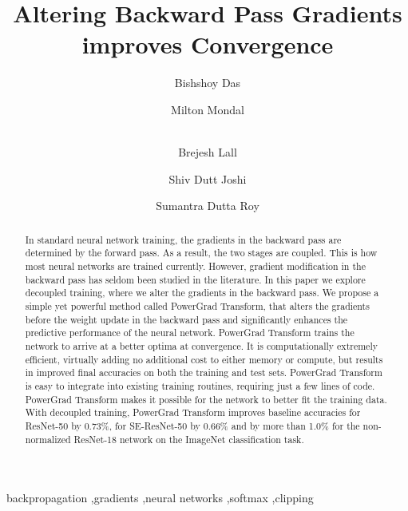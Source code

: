 \documentclass[times,sort&compress]{elsarticle}
\begin{document}
\clearpage


\ifpreprint
  \setcounter{page}{1}
\else
  \setcounter{page}{1}
\fi

\begin{frontmatter}

\title{Altering Backward Pass Gradients improves Convergence}

\author[1]{Bishshoy Das}

\author[1]{Milton Mondal}

\author[1]{\\ Brejesh Lall}

\author[1]{Shiv Dutt Joshi}

\author[1]{Sumantra Dutta Roy}


\address[1]{Electrical Engineering Department, Indian Institute of Technology Delhi, Hauz Khas, New Delhi - 110016, India}



\begin{abstract}
In standard neural network training, the gradients in the backward pass are determined
by the forward pass. As a result, the two stages are coupled. This is how most neural
networks are trained currently. However, gradient modification in the backward pass has
seldom been studied in the literature. In this paper we explore decoupled training,
where we alter the gradients in the backward pass. We propose a simple yet powerful
method called PowerGrad Transform, that alters the gradients before the weight update in
the backward pass and significantly enhances the predictive performance of the neural
network. PowerGrad Transform trains the network to arrive at a better optima at
convergence. It is computationally extremely efficient, virtually adding no additional
cost to either memory or compute, but results in improved final accuracies on both the
training and test sets. PowerGrad Transform is easy to integrate into existing training
routines, requiring just a few lines of code. PowerGrad Transform makes it possible for
the network to better fit the training data. With decoupled training, PowerGrad
Transform improves baseline accuracies for ResNet-50 by 0.73\%, for SE-ResNet-50 by
0.66\% and by more than 1.0\% for the non-normalized ResNet-18 network on the ImageNet
classification task.
\end{abstract}

\begin{keyword}
\KWD backpropagation \sep gradients \sep neural networks \sep softmax \sep clipping
\end{keyword}

\end{frontmatter}
\end{document}
